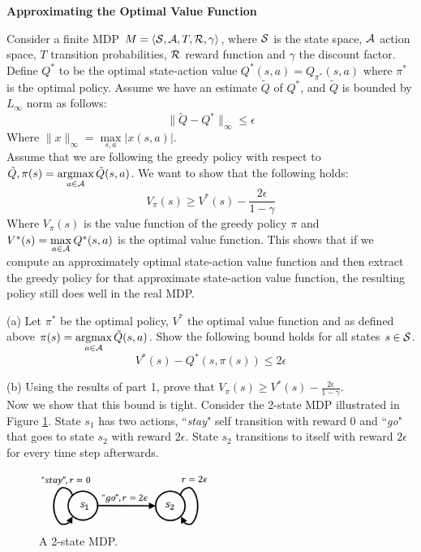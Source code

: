 \begin{homeworkProblem}

\textbf{Approximating the Optimal Value Function}

Consider a finite MDP $M=\langle \mathcal{S}, \mathcal{A}, T, \mathcal{R}, \gamma\rangle$, where $\mathcal{S}$ is the state space, $\mathcal{A}$ action space, $T$ transition probabilities, $\mathcal{R}$ reward function and $\gamma$ the discount factor. Define $Q^*$ to be the optimal state-action value $Q^*(s, a)=Q_{\pi^*}(s, a)$ where $\pi^*$ is the optimal policy. Assume we have an estimate $\tilde{Q}$ of $Q^*$, and $\tilde{Q}$ is bounded by $L_{\infty}$ norm as follows:
$$\|\tilde{Q}-Q^*\|_{\infty} \leq \epsilon$$
Where $\|x\|_{\infty}=\max\limits_{s, a}|x(s, a)|$. \\
Assume that we are following the greedy policy with respect to $\tilde{Q}, \pi(s)=\mathop{\rm argmax}\limits_{a \in \mathcal{A}} \tilde{Q}(s, a)$. We want to show that the following holds:
$$V_\pi(s) \geq V^*(s)-\frac{2 \epsilon}{1-\gamma}$$
Where $V_{\pi}(s)$ is the value function of the greedy policy $\pi$ and $V^*(s)=\max\limits_{a \in \mathcal{A}} Q^*(s, a)$ is the optimal value function. This shows that if we compute an approximately optimal state-action value function and then extract the greedy policy for that approximate state-action value function, the resulting policy still does well in the real MDP.

(a) Let $\pi^*$ be the optimal policy, $V^*$ the optimal value function and as defined above $\pi(s)=\mathop{\rm argmax}\limits_{a \in \mathcal{A}} \tilde{Q}(s, a)$. Show the following bound holds for all states $s \in \mathcal{S}$.
$$V^*(s)-Q^*(s, \pi(s)) \leq 2 \epsilon$$

(b) Using the results of part 1, prove that $V_\pi(s) \geq V^*(s)-\frac{2\epsilon}{1-\gamma}$. \\
Now we show that this bound is tight. Consider the 2-state MDP illustrated in Figure \ref{fig:approximate}. State $s_1$ has two actions, ``\textit{stay}" self transition with reward 0 and ``\textit{go}" that goes
to state $s_2$ with reward $2\epsilon$. State $s_2$ transitions to itself with reward $2\epsilon$ for every time step afterwards.
\begin{figure}[h]
    \centering
    \vspace{-0.4cm}
    \includegraphics[width=0.5\textwidth]{./figure/approximate.png}
    \vspace{-0.4cm}
    \caption{A 2-state MDP.}
    \vspace{-0.4cm}
    \label{fig:approximate}
\end{figure}


\end{homeworkProblem}
